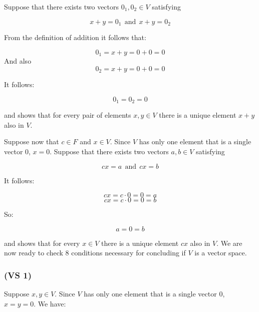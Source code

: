 \documentclass{article}
\begin{document}
Suppose that there exists two vectors \(0_{1}, 0_{2} \in V\) satisfying

\begin{equation*}
    x + y = 0_{1} \ \ \mbox{and} \ \ x + y = 0_{2}
\end{equation*}

From the definition of addition it follows that:

\begin{equation*}
    0_{1} = x + y = 0 + 0 = 0 
\end{equation*}
And also
\begin{equation*}
    0_{2} = x + y = 0 + 0 = 0
\end{equation*}

It follows:

\begin{equation*}
    0_{1} = 0_{2} = 0
\end{equation*}

and shows that for every pair of elements \(x, y \in V\) there is a unique element \(x + y\) also
in \(V\). 


Suppose now that \(c \in F\) and \(x \in V\). Since \(V\) has only one element
that is a single vector \(0\), \(x = 0\). Suppose that there exists two vectors \(a, b \in V\) satisfying

\begin{equation*}
    cx = a \ \ \mbox{and} \ \ cx = b
\end{equation*}

It follows:

\begin{equation*}
    cx = c \cdot 0 = 0 = a
\end{equation*}
\begin{equation*}
    cx = c \cdot 0 = 0 = b
\end{equation*}

So:

\begin{equation*}
    a = 0 = b
\end{equation*}

and shows that for every \(x \in V\) there is a unique element \(cx\) also
in \(V\). We are now ready to check 8 conditions necessary for concluding if \(V\) is a vector space. 


\subsubsection*{(VS 1)}

Suppose \(x, y \in V\). Since \(V\) has only one element
that is a single vector \(0\), \(x = y = 0\).  We have:
\end{document}
